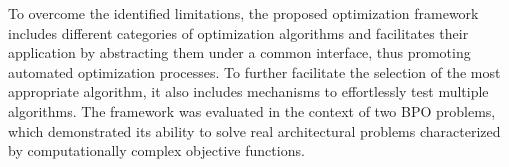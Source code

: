 To overcome the identified limitations, the proposed optimization framework includes different categories of optimization algorithms and facilitates their application by abstracting them under a common interface, thus promoting automated optimization processes. To further facilitate the selection of the most appropriate algorithm, it also includes mechanisms to effortlessly test multiple algorithms. The framework was evaluated in the context of two \ac{BPO} problems, which demonstrated its ability to solve real architectural problems characterized by computationally complex objective functions.

